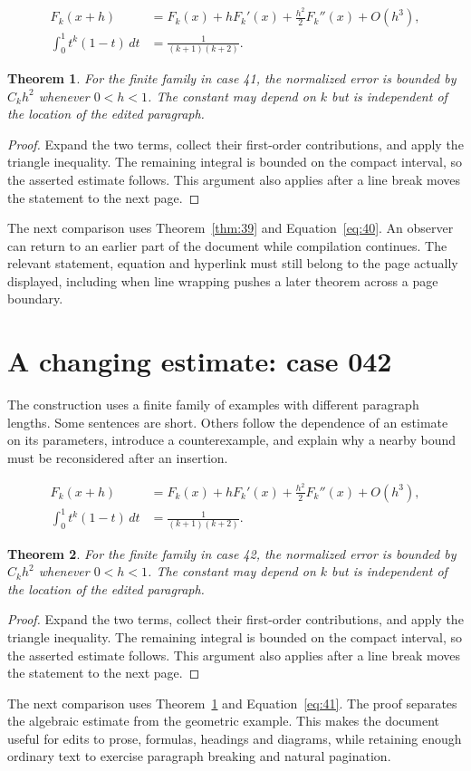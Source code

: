 \documentclass[a4paper,10pt]{article}
\newtheorem{theorem}{Theorem}[section]
\begin{document}
\lipsum[1-2]
\begin{align}\label{eq:40}
 F_k(x+h)&=F_k(x)+hF_k'(x)+\frac{h^2}{2}F_k''(x)+O(h^3),\\
 \int_0^1 t^k(1-t)\,dt&=\frac{1}{(k+1)(k+2)}.
\end{align}
\begin{theorem}\label{thm:40}
For the finite family in case 41, the normalized error is bounded by $C_k h^2$ whenever $0<h<1$. The constant may depend on $k$ but is independent of the location of the edited paragraph.
\end{theorem}
\begin{proof}
Expand the two terms, collect their first-order contributions, and apply the
triangle inequality. The remaining integral is bounded on the compact interval,
so the asserted estimate follows. This argument also applies after a line break
moves the statement to the next page.
\end{proof}
The next comparison uses Theorem~\ref{thm:39} and Equation~\ref{eq:40}. An observer can return to an earlier part of the document while compilation continues. The relevant statement, equation and hyperlink must still belong to the page actually displayed, including when line wrapping pushes a later theorem across a page boundary.

\lipsum[3]

\section{A changing estimate: case 042}\label{unit:41}
The construction uses a finite family of examples with different paragraph lengths. Some sentences are short. Others follow the dependence of an estimate on its parameters, introduce a counterexample, and explain why a nearby bound must be reconsidered after an insertion.

\lipsum[4-5]
\begin{align}\label{eq:41}
 F_k(x+h)&=F_k(x)+hF_k'(x)+\frac{h^2}{2}F_k''(x)+O(h^3),\\
 \int_0^1 t^k(1-t)\,dt&=\frac{1}{(k+1)(k+2)}.
\end{align}
\begin{theorem}\label{thm:41}
For the finite family in case 42, the normalized error is bounded by $C_k h^2$ whenever $0<h<1$. The constant may depend on $k$ but is independent of the location of the edited paragraph.
\end{theorem}
\begin{proof}
Expand the two terms, collect their first-order contributions, and apply the
triangle inequality. The remaining integral is bounded on the compact interval,
so the asserted estimate follows. This argument also applies after a line break
moves the statement to the next page.
\end{proof}
The next comparison uses Theorem~\ref{thm:40} and Equation~\ref{eq:41}. The proof separates the algebraic estimate from the geometric example. This makes the document useful for edits to prose, formulas, headings and diagrams, while retaining enough ordinary text to exercise paragraph breaking and natural pagination.
\end{document}
